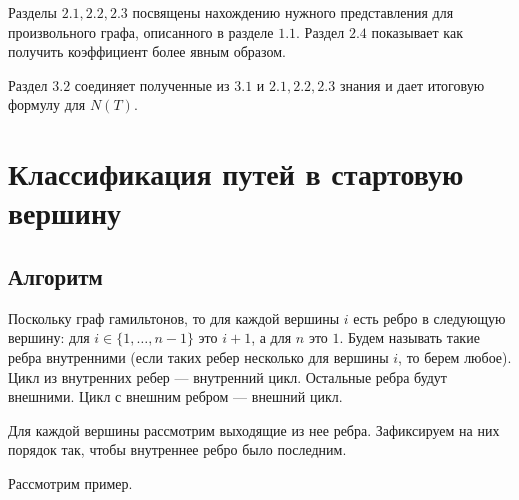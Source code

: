 \documentclass{article}
\begin{document}
Разделы $2.1, 2.2, 2.3$ посвящены нахождению нужного представления для произвольного графа, описанного в разделе $1.1$. Раздел $2.4$ показывает как получить коэффициент более явным образом.

Раздел $3.2$ соединяет полученные из $3.1$ и $2.1, 2.2, 2.3$ знания и дает итоговую формулу для $N(T)$.





\section{Классификация путей в стартовую вершину}

\subsection{Алгоритм}

Поскольку граф гамильтонов, то для каждой вершины $i$ есть ребро в следующую вершину: для $i \in \{1, \ldots, n - 1\}$ это $i + 1$, а для $n$ это $1$. 
Будем называть такие ребра внутренними (если таких ребер несколько для вершины $i$, то берем любое). Цикл из внутренних ребер --- внутренний цикл. Остальные ребра будут внешними. Цикл с внешним ребром --- внешний цикл.

Для каждой вершины рассмотрим выходящие из нее ребра. Зафиксируем на них порядок так, чтобы внутреннее ребро было последним.

Рассмотрим пример.
\end{document}
